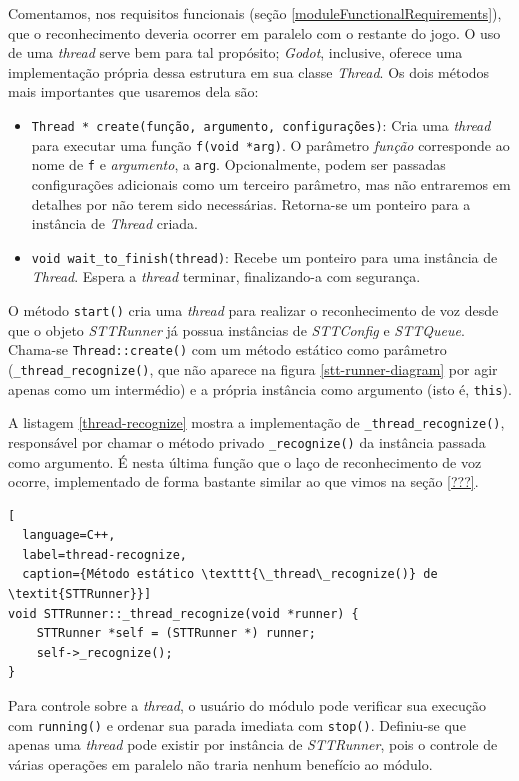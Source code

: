 Comentamos, nos requisitos funcionais (seção \ref{moduleFunctionalRequirements}), que o reconhecimento deveria ocorrer em paralelo com o restante do jogo. O uso de uma \textit{thread} serve bem para tal propósito; \textit{Godot}, inclusive, oferece uma implementação própria dessa estrutura em sua classe \textit{Thread}. Os dois métodos mais importantes que usaremos dela são:

\begin{itemize}
\item \texttt{Thread * create(função, argumento, configurações)}: Cria uma \textit{thread} para executar uma função \texttt{f(void *arg)}. O parâmetro \textit{função} corresponde ao nome de \texttt{f} e \textit{argumento}, a \texttt{arg}. Opcionalmente, podem ser passadas configurações adicionais como um terceiro parâmetro, mas não entraremos em detalhes por não terem sido necessárias. Retorna-se um ponteiro para a instância de \textit{Thread} criada.

\item \texttt{void wait\_to\_finish(thread)}: Recebe um ponteiro para uma instância de \textit{Thread}. Espera a \textit{thread} terminar, finalizando-a com segurança.
\end{itemize}

O método \texttt{start()} cria uma \textit{thread} para realizar o reconhecimento de voz desde que o objeto \textit{STTRunner} já possua instâncias de \textit{STTConfig} e \textit{STTQueue}. Chama-se \texttt{Thread::create()} com um método estático como parâmetro (\texttt{\_thread\_recognize()}, que não aparece na figura \ref{stt-runner-diagram} por agir apenas como um intermédio) e a própria instância como argumento (isto é, \texttt{this}).

A listagem \ref{thread-recognize} mostra a implementação de \texttt{\_thread\_recognize()}, responsável por chamar o método privado \texttt{\_recognize()} da instância passada como argumento. É nesta última função que o laço de reconhecimento de voz ocorre, implementado de forma bastante similar ao que vimos na seção \ref{???}.

\begin{lstlisting}[
  language=C++,
  label=thread-recognize,
  caption={Método estático \texttt{\_thread\_recognize()} de \textit{STTRunner}}]
void STTRunner::_thread_recognize(void *runner) {
    STTRunner *self = (STTRunner *) runner;
    self->_recognize();
}
\end{lstlisting}

Para controle sobre a \textit{thread}, o usuário do módulo pode verificar sua execução com \texttt{running()} e ordenar sua parada imediata com \texttt{stop()}. Definiu-se que apenas uma \textit{thread} pode existir por instância de \textit{STTRunner}, pois o controle de várias operações em paralelo não traria nenhum benefício ao módulo.

